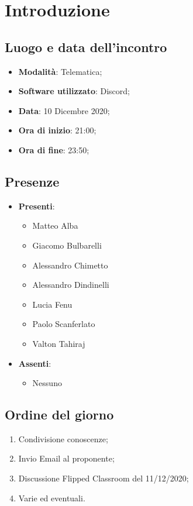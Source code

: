 \documentclass[]{article}
\begin{document}
	
	
	
	\newpage
\section{Introduzione}
\subsection{Luogo e data dell'incontro}
\begin{itemize}
	\item \textbf{Modalità}: Telematica;
	\item \textbf{Software utilizzato}: Discord;
	\item \textbf{Data}: 10 Dicembre 2020;
	\item \textbf{Ora di inizio}: 21:00;
	\item \textbf{Ora di fine}: 23:50;
\end{itemize}

\subsection{Presenze}
\begin{itemize}
	\item \textbf{Presenti}:
	\begin{itemize}
		\item Matteo Alba
		\item Giacomo Bulbarelli
		\item Alessandro Chimetto
		\item Alessandro Dindinelli
		\item Lucia Fenu
		\item Paolo Scanferlato
		\item Valton Tahiraj
	\end{itemize}
	\item \textbf{Assenti}:
	\begin{itemize}
		\item Nessuno
	\end{itemize}
\end{itemize}


\subsection{Ordine del giorno}
\begin{enumerate}
	\item Condivisione conoscenze;
	\item Invio Email al proponente;
	\item Discussione Flipped Classroom del 11/12/2020;
	\item Varie ed eventuali.
\end{enumerate}
\end{document}
